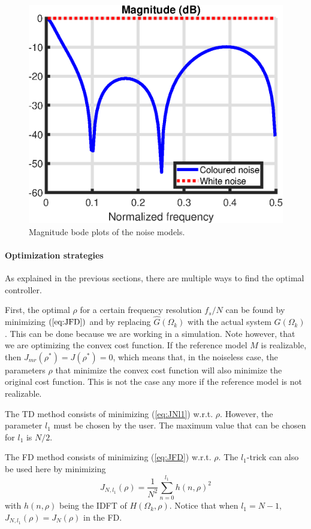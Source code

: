 \begin{figure}[H]
\centering
\includegraphics[width=0.6\linewidth]{figures/noise_models.eps}
\caption{Magnitude bode plots of the noise models.}
\label{fig:noise_models}
\end{figure}

\paragraph{Optimization strategies}
As explained in the previous sections, there are multiple ways to find the optimal controller. 

First, the optimal $\rho$ for a certain frequency resolution $f_s/N$ can be found by minimizing $(\ref{eq:JFD})$ and by replacing $\hat{G}(\Omega_k)$ with the actual system $G(\Omega_k)$. This can be done because we are working in a simulation. Note however, that we are optimizing the convex cost function. If the reference model $M$ is realizable, then $J_{mr}(\rho^*) = J(\rho^*) = 0$, which means that, in the noiseless case, the parameters $\rho$ that minimize the convex cost function will also minimize the original cost function. This is not the case any more if the reference model is not realizable.

The TD method consists of minimizing (\ref{eq:JNl1}) w.r.t. $\rho$. However, the parameter $l_1$ must be chosen by the user. The maximum value that can be chosen for $l_1$ is $N/2$. 

The FD method consists of minimizing (\ref{eq:JFD}) w.r.t. $\rho$. The $l_1$-trick can also be used here by minimizing 
\begin{equation}
\boxed{
J_{N,l_1}(\rho) = \frac{1}{N^2}\sum_{n=0}^{l_1} h(n,\rho)^2}
\label{eq:JNl1_FD}
\end{equation}
with $h(n,\rho)$ being the IDFT of $H(\Omega_k,\rho)$. Notice that when $l_1 = N - 1$, $J_{N,l_1}(\rho) = J_N(\rho)$ in the FD.

